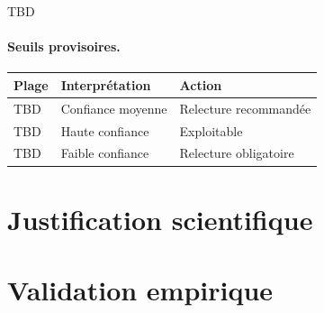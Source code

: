 

TBD
\paragraph{Seuils provisoires.}

\begin{center}
\begin{tabular}{lll}
\toprule
\textbf{Plage} & \textbf{Interprétation} & \textbf{Action} \\
\midrule
TBD           & Confiance moyenne & Relecture recommandée \\
TBD           & Haute confiance  & Exploitable \\
TBD           & Faible confiance  & Relecture obligatoire \\
\bottomrule
\end{tabular}
\end{center}

\section{Justification scientifique}

\section{Validation empirique}

